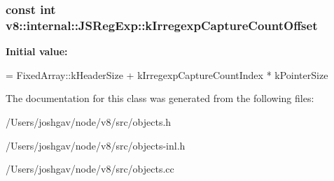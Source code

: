\subsubsection[{\texorpdfstring{k\+Irregexp\+Capture\+Count\+Offset}{kIrregexpCaptureCountOffset}}]{\setlength{\rightskip}{0pt plus 5cm}const int v8\+::internal\+::\+J\+S\+Reg\+Exp\+::k\+Irregexp\+Capture\+Count\+Offset\hspace{0.3cm}{\ttfamily [static]}}\hypertarget{classv8_1_1internal_1_1_j_s_reg_exp_a73f20a1f8eedfd27dad9c34fc2e24468}{}\label{classv8_1_1internal_1_1_j_s_reg_exp_a73f20a1f8eedfd27dad9c34fc2e24468}
{\bfseries Initial value\+:}
\begin{DoxyCode}
=
      FixedArray::kHeaderSize + kIrregexpCaptureCountIndex * kPointerSize
\end{DoxyCode}


The documentation for this class was generated from the following files\+:\begin{DoxyCompactItemize}
\item 
/\+Users/joshgav/node/v8/src/objects.\+h\item 
/\+Users/joshgav/node/v8/src/objects-\/inl.\+h\item 
/\+Users/joshgav/node/v8/src/objects.\+cc\end{DoxyCompactItemize}

